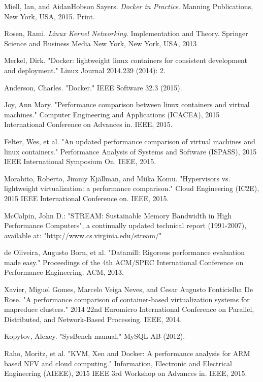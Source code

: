 \documentclass[11pt]{article}
\begin{document}
\begin{thebibliography}{99}
	Miell, Ian, and AidanHobson Sayers. \textit{Docker in Practice}. Manning Publications, New York, USA, 2015. Print.
	
	Rosen, Rami. \textit{Linux Kernel Networking}. Implementation and Theory. Springer Science and Business Media New York, New York, USA, 2013
	
	Merkel, Dirk. "Docker: lightweight linux containers for consistent development and deployment." Linux Journal 2014.239 (2014): 2.
	
	Anderson, Charles. "Docker." IEEE Software 32.3 (2015).
	
	Joy, Ann Mary. "Performance comparison between linux containers and virtual machines." Computer Engineering and Applications (ICACEA), 2015 International Conference on Advances in. IEEE, 2015.
	
	Felter, Wes, et al. "An updated performance comparison of virtual machines and linux containers." Performance Analysis of Systems and Software (ISPASS), 2015 IEEE International Symposium On. IEEE, 2015.
	
	Morabito, Roberto, Jimmy Kjällman, and Miika Komu. "Hypervisors vs. lightweight virtualization: a performance comparison." Cloud Engineering (IC2E), 2015 IEEE International Conference on. IEEE, 2015.
	
	McCalpin, John D.: "STREAM: Sustainable Memory Bandwidth in
	High Performance Computers", a continually updated technical report
	(1991-2007), available at: "http://www.cs.virginia.edu/stream/"
	
	de Oliveira, Augusto Born, et al. "Datamill: Rigorous performance evaluation made easy." Proceedings of the 4th ACM/SPEC International Conference on Performance Engineering. ACM, 2013.
	
	Xavier, Miguel Gomes, Marcelo Veiga Neves, and Cesar Augusto Fonticielha De Rose. "A performance comparison of container-based virtualization systems for mapreduce clusters." 2014 22nd Euromicro International Conference on Parallel, Distributed, and Network-Based Processing. IEEE, 2014.
	
	Kopytov, Alexey. "SysBench manual." MySQL AB (2012).
	
	Raho, Moritz, et al. "KVM, Xen and Docker: A performance analysis for ARM based NFV and cloud computing." Information, Electronic and Electrical Engineering (AIEEE), 2015 IEEE 3rd Workshop on Advances in. IEEE, 2015.
	

\end{thebibliography}
\end{document}

